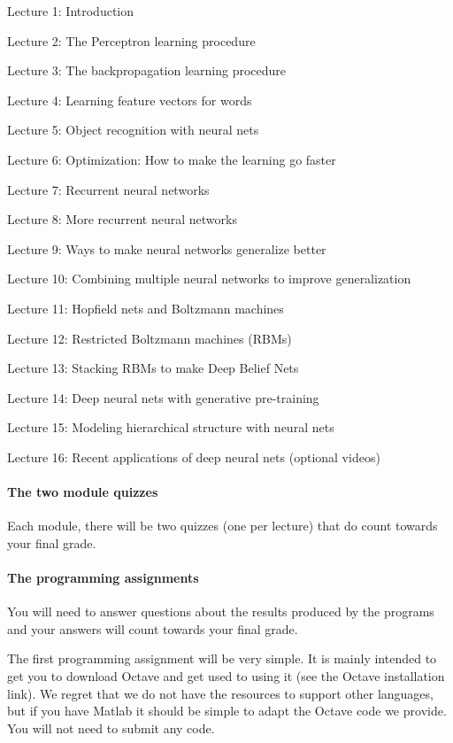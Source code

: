 \begin{nitemize}
\item Lecture 1: Introduction
\item Lecture 2: The Perceptron learning procedure
\item Lecture 3: The backpropagation learning procedure
\item Lecture 4: Learning feature vectors for words
\item Lecture 5: Object recognition with neural nets
\item Lecture 6: Optimization: How to make the learning go faster
\item Lecture 7: Recurrent neural networks
\item Lecture 8: More recurrent neural networks
\item Lecture 9: Ways to make neural networks generalize better
\item Lecture 10: Combining multiple neural networks to improve generalization
\item Lecture 11: Hopfield nets and Boltzmann machines
\item Lecture 12: Restricted Boltzmann machines (RBMs)
\item Lecture 13: Stacking RBMs to make Deep Belief Nets
\item Lecture 14: Deep neural nets with generative pre-training
\item Lecture 15: Modeling hierarchical structure with neural nets
\item Lecture 16: Recent applications of deep neural nets (optional videos)
\end{nitemize}

\paragraph{The two module quizzes}

Each module, there will be two quizzes (one per lecture) that do count towards your final grade.


\paragraph{The programming assignments}

You will need to answer questions about the results produced by the programs and your answers will count towards your final grade.

The first programming assignment will be very simple. It is mainly intended to get you to download Octave and get used to using it (see the Octave installation link). We regret that we do not have the resources to support other languages, but if you have Matlab it should be simple to adapt the Octave code we provide. You will not need to submit any code.


